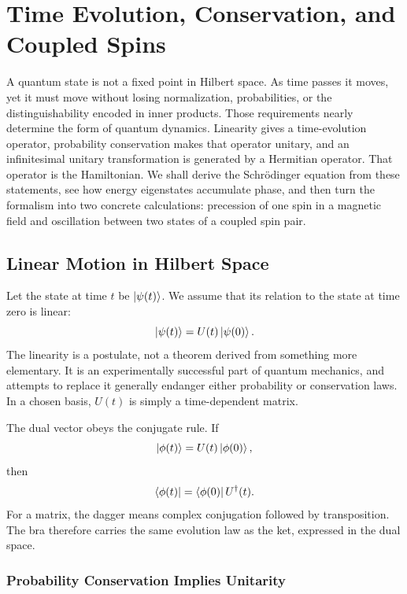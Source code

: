 \chapter{Time Evolution, Conservation, and Coupled Spins}

A quantum state is not a fixed point in Hilbert space. As time passes it moves, yet it must move without losing normalization, probabilities, or the distinguishability encoded in inner products. Those requirements nearly determine the form of quantum dynamics. Linearity gives a time-evolution operator, probability conservation makes that operator unitary, and an infinitesimal unitary transformation is generated by a Hermitian operator. That operator is the Hamiltonian. We shall derive the Schr\"odinger equation from these statements, see how energy eigenstates accumulate phase, and then turn the formalism into two concrete calculations: precession of one spin in a magnetic field and oscillation between two states of a coupled spin pair.

\section{Linear Motion in Hilbert Space}

Let the state at time \(t\) be \(\left\lvert\psi(t)\right\rangle\). We assume that its relation to the state at time zero is linear:
\begin{equation}
\left\lvert\psi(t)\right\rangle=U(t)\left\lvert\psi(0)\right\rangle.
\end{equation}
The linearity is a postulate, not a theorem derived from something more elementary. It is an experimentally successful part of quantum mechanics, and attempts to replace it generally endanger either probability or conservation laws. In a chosen basis, \(U(t)\) is simply a time-dependent matrix.

The dual vector obeys the conjugate rule. If
\begin{equation}
\left\lvert\phi(t)\right\rangle=U(t)\left\lvert\phi(0)\right\rangle,
\end{equation}
then
\begin{equation}
\left\langle\phi(t)\right\rvert=\left\langle\phi(0)\right\rvert U^\dagger(t).
\end{equation}
For a matrix, the dagger means complex conjugation followed by transposition. The bra therefore carries the same evolution law as the ket, expressed in the dual space.

\subsection{Probability Conservation Implies Unitarity}

